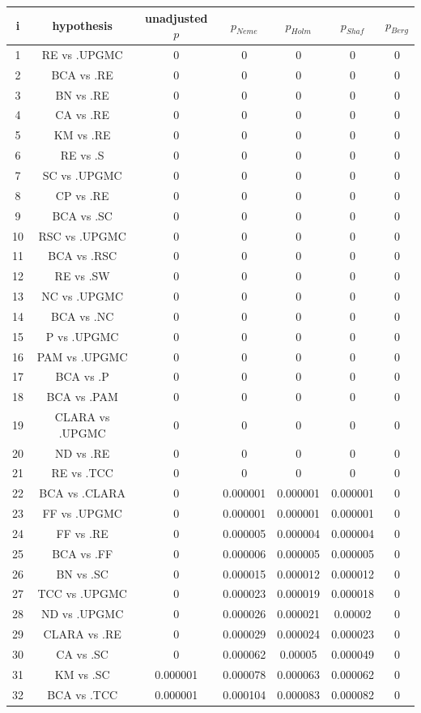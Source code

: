 \documentclass[a4paper,10pt]{article}
\begin{document}
\begin{landscape}
\begin{table}[!htp]
\centering\scriptsize
\begin{tabular}{ccccccc}
i&hypothesis&unadjusted $p$&$p_{Neme}$&$p_{Holm}$&$p_{Shaf}$&$p_{Berg}$\\
\hline1&RE vs .UPGMC&0&0&0&0&0\\
2&BCA vs .RE&0&0&0&0&0\\
3&BN vs .RE&0&0&0&0&0\\
4&CA vs .RE&0&0&0&0&0\\
5&KM vs .RE&0&0&0&0&0\\
6&RE vs .S&0&0&0&0&0\\
7&SC vs .UPGMC&0&0&0&0&0\\
8&CP vs .RE&0&0&0&0&0\\
9&BCA vs .SC&0&0&0&0&0\\
10&RSC vs .UPGMC&0&0&0&0&0\\
11&BCA vs .RSC&0&0&0&0&0\\
12&RE vs .SW&0&0&0&0&0\\
13&NC vs .UPGMC&0&0&0&0&0\\
14&BCA vs .NC&0&0&0&0&0\\
15&P vs .UPGMC&0&0&0&0&0\\
16&PAM vs .UPGMC&0&0&0&0&0\\
17&BCA vs .P&0&0&0&0&0\\
18&BCA vs .PAM&0&0&0&0&0\\
19&CLARA vs .UPGMC&0&0&0&0&0\\
20&ND vs .RE&0&0&0&0&0\\
21&RE vs .TCC&0&0&0&0&0\\
22&BCA vs .CLARA&0&0.000001&0.000001&0.000001&0\\
23&FF vs .UPGMC&0&0.000001&0.000001&0.000001&0\\
24&FF vs .RE&0&0.000005&0.000004&0.000004&0\\
25&BCA vs .FF&0&0.000006&0.000005&0.000005&0\\
26&BN vs .SC&0&0.000015&0.000012&0.000012&0\\
27&TCC vs .UPGMC&0&0.000023&0.000019&0.000018&0\\
28&ND vs .UPGMC&0&0.000026&0.000021&0.00002&0\\
29&CLARA vs .RE&0&0.000029&0.000024&0.000023&0\\
30&CA vs .SC&0&0.000062&0.00005&0.000049&0\\
31&KM vs .SC&0.000001&0.000078&0.000063&0.000062&0\\
32&BCA vs .TCC&0.000001&0.000104&0.000083&0.000082&0\\

\end{tabular}
\end{table}
\end{landscape}
\end{document}
